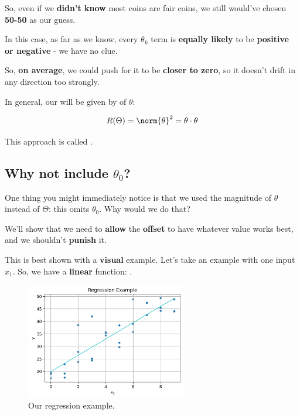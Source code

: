         So, even if we \textbf{didn't know} most coins are fair coins, we still would've chosen \textbf{50-50} as our guess.
        
        In this case, as far as we know, every $\theta_k$ term is \textbf{equally likely} to be \textbf{positive or negative} - we have no clue.
        
        So, \textbf{on average}, we could push for it to be \textbf{closer to zero}, so it doesn't drift in any direction too strongly.\\
        
        \begin{kequation}
            In general, our  will be given by  of $\theta$:
            
            \begin{equation*}
                R(\Theta) = \norm{\theta}^2 = \theta \cdot \theta
            \end{equation*}
            
            This approach is called .
        \end{kequation}
        
        
    \subsection{Why not include $\theta_0$?}
    
        One thing you might immediately notice is that we used the magnitude of $\theta$ instead of $\Theta$: this omits $\theta_0$. Why would we do that?
        
        We'll show that we need to \textbf{allow} the \textbf{offset} to have whatever value works best, and we shouldn't \textbf{punish} it. 
        
        This is best shown with a \textbf{visual} example. Let's take an example with one input $x_1$. So, we have a \textbf{linear} function: .
        
        \begin{figure}[H]
        \centering
            \includegraphics[width=70mm,scale=0.5]{images/regression_images/Regression_Keep_Offset.png}
        
            \caption*{Our regression example.}
        \end{figure}
        
